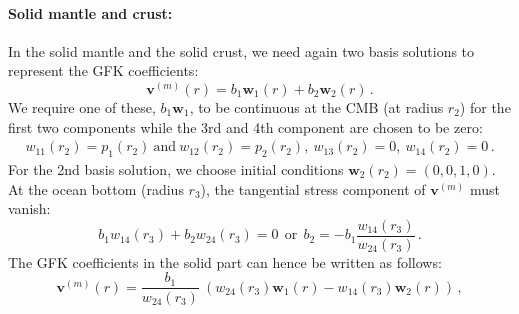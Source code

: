 \documentclass[12pt,a4paper]{article}
\begin{document}
\paragraph{Solid mantle and crust:}
In the solid mantle and the solid crust, we need again two basis solutions to represent the GFK coefficients:
\begin{equation}
\mathbf{v}^{(m)}(r) = b_1 \mathbf{w}_1(r)+b_2 \mathbf{w}_2(r) \,.
\end{equation}
We require one of these, $b_1\mathbf{w}_1$, to be continuous at the CMB (at radius $r_2$) for the first two components while the 3rd and 4th component are chosen to be zero:
\begin{align}
w_{11}(r_2) = p_1(r_2) \ \mathrm{and}\ w_{12}(r_2) = p_2(r_2),\ w_{13}(r_2)=0,\ w_{14}(r_2) = 0 \,.
\end{align}
For the 2nd basis solution, 
we choose initial conditions $\mathbf{w}_2(r_2) = (0,0,1,0)$.
At the ocean bottom (radius $r_3$), the tangential stress component of $\mathbf{v}^{(m)}$ must vanish:
\begin{equation}
b_1 w_{14}(r_3)+b_2 w_{24}(r_3) = 0\ \ \mathrm{or}\ \ b_2 = -b_1\frac{w_{14}(r_3)}{w_{24}(r_3)} \,.
\end{equation}
The GFK coefficients in the solid part can hence be written as follows:
\begin{equation}
\mathbf{v}^{(m)}(r) = \frac{b_1}{w_{24}(r_3)}\ (w_{24}(r_3)\mathbf{w}_1(r) - w_{14}(r_3) \mathbf{w}_2(r)) \,,
\end{equation}
%
\end{document}
